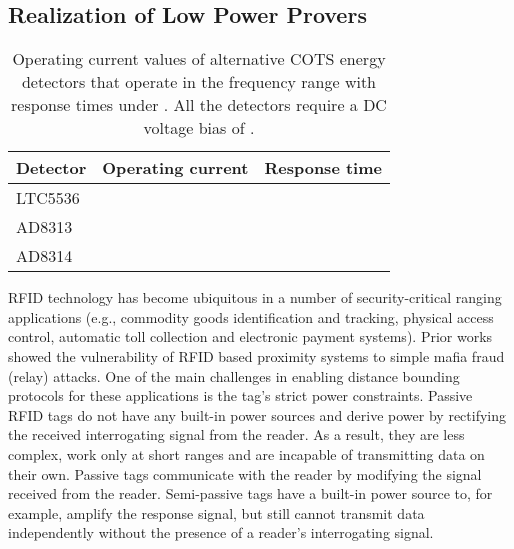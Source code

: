 \documentclass{sig-alternate-10pt}
\newcommand{\eg}{e.g.,\xspace}
\begin{document}
\subsection{Realization of Low Power Provers}
\label{sec:low-power-prover}


\begin{table}
  \centering
  \begin{tabular}[h]{l|l|l}
  \hline
  \textbf{Detector}&\textbf{Operating current}&\textbf{Response time}\\
  \hline
  LTC5536 & &  \\
  AD8313 & &  \\
  AD8314 & &  \\
  \hline
  \end{tabular}
  \caption{Operating current values of alternative COTS energy detectors that
    operate in the  frequency range with response times under
    . All the detectors require a DC voltage bias of .} 
  \label{tab:current-ratings-ed}
\end{table}


RFID technology has become ubiquitous in a number of security-critical ranging
applications (\eg commodity goods identification and tracking, physical access
control, automatic toll collection and electronic payment systems). Prior
works~\cite{FrancillonFeb11,FrancisDec10,RolandSep12} showed the vulnerability
of RFID based proximity systems to simple mafia fraud (relay) attacks. One of
the main challenges in enabling distance bounding protocols for these
applications is the tag's strict power constraints. Passive RFID tags do not
have any built-in power sources and derive power by rectifying the received
interrogating signal from the reader. As a result, they are less complex, work
only at short ranges and are incapable of transmitting data on their own.
Passive tags communicate with the reader by modifying the signal received from
the reader. Semi-passive tags have a built-in power source to, for example,
amplify the response signal, but still cannot transmit data independently
without the presence of a reader's interrogating signal.
\end{document}

